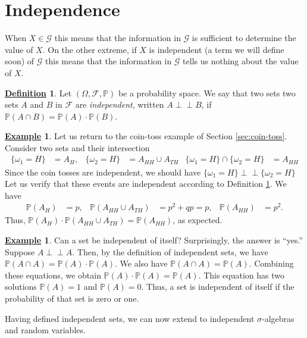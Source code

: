\documentclass[12pt]{book}
\numberwithin{equation}{chapter}
\theoremstyle{plain}
\numberwithin{theorem}{section}
\theoremstyle{definition}
\newtheorem{definition}[theorem]{\underline{Definition}}
\newtheorem{example}[theorem]{\underline{Example}}
\numberwithin{exercise}{chapter}
\newcommand{\<}{\langle}
\renewcommand{\>}{\rangle}
\renewcommand{\(}{\left(}
\renewcommand{\)}{\right)}
\renewcommand{\[}{\left[}
\renewcommand{\]}{\right]}
\newcommand\Pb{\mathds{P}}
\newcommand\Fc{\mathscr{F}}
\newcommand\Gc{\mathscr{G}}
\newcommand\om{\omega}
\newcommand\Om{\Omega}
\newcommand\sig{\sigma}
\newcommand{\ind}{\perp \! \! \! \perp}
\begin{document}
\section{Independence}
When $X \in \Gc$ this means that the information in $\Gc$ is sufficient to determine the value of $X$.  On the other extreme, if $X$ is independent (a term we will define soon) of $\Gc$ this means that the information in $\Gc$ tells us nothing about the value of $X$.

\begin{definition}
\label{def:independent.sets}
Let  $(\Om,\Fc,\Pb)$ be a probability space. We say that two sets two sets $A$ and $B$ in $\Fc$ are \emph{independent}, written $A \ind B$, if $\Pb(A \cap B) = \Pb(A) \cdot \Pb(B)$.
\end{definition}

\begin{example}
Let us return to the coin-toss example of Section \ref{sec:coin-toss}.  Consider two sets and their intersection
\begin{align}
\{ \om_1 = H \}
	&=	A_H , &
\{ \om_2 = H \}
	&=	A_{HH} \cup A_{TH} &
\{ \om_1 = H \} \cap \{ \om_2 = H \}
	&=	A_{HH}
\end{align}
Since the coin tosses are independent, we should have $\{ \om_1 = H \} \ind \{ \om_2 = H \}$
Let us verify that these events are independent according to Definition \ref{def:independent.sets}.  We have
\begin{align}
\Pb( A_H )
	&=	p , &
\Pb( A_{HH} \cup A_{TH} )
	&=	p^2 + q p = p , &
\Pb( A_{HH} )
	&=	p^2 .
\end{align}
Thus, $\Pb( A_H ) \cdot \Pb( A_{HH} \cup A_{TH} ) = \Pb( A_{HH} )$, as expected.
\end{example}

\begin{example}
Can a set be independent of itself?  Surprisingly, the answer is ``yes.''  Suppose $A \ind A$.  Then, by the definition of independent sets, we have
$\Pb( A \cap A ) 	=	\Pb(A) \cdot \Pb(A)$.  We also have $\Pb( A \cap A ) = \Pb(A)$.  Combining these equations, we obtain $\Pb(A) \cdot \Pb(A) = \Pb(A)$.  This equation has two solutions $\Pb(A) = 1$ and $\Pb(A) = 0$.  Thus, a set is independent of itself if the probability of that set is zero or one.
\end{example}

\noindent
Having defined independent sets, we can now extend to independent $\sig$-algebras and random variables.
\end{document}
